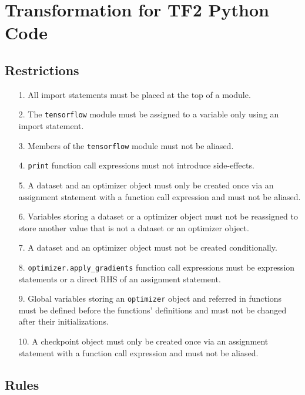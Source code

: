 
\newpage
\section{Transformation for TF2 Python Code}
\subsection{Restrictions}
\begin{itemize}
  \item[1.] All import statements must be placed at the top of a module.  
  \item[2.] The {\tt tensorflow} module must be assigned to a variable only
    using an import statement.
  \item[3.] Members of the {\tt tensorflow} module must not be aliased.
  \item[4.] {\tt print} function call expressions must not introduce
    side-effects.
  \item[5.] A dataset and an optimizer object must only be created once via an
    assignment statement with a function call expression and must not be
    aliased.
  \item[6.] Variables storing a dataset or a optimizer object must not be
    reassigned to store another value that is not a dataset or an optimizer
    object.
  \item[7.] A dataset and an optimizer object must not be created
    conditionally.
  \item[8.] {\tt optimizer.apply\_gradients} function call expressions must be
    expression statements or a direct RHS of an assignment statement.
  \item[9.] Global variables storing an {\tt optimizer} object and referred in
    functions must be defined before the functions' definitions and must not be
    changed after their initializations.
  \item[10.] A checkpoint object must only be created once via an assignment
    statement with a function call expression and must not be aliased. 
\end{itemize}
\subsection{Rules}
